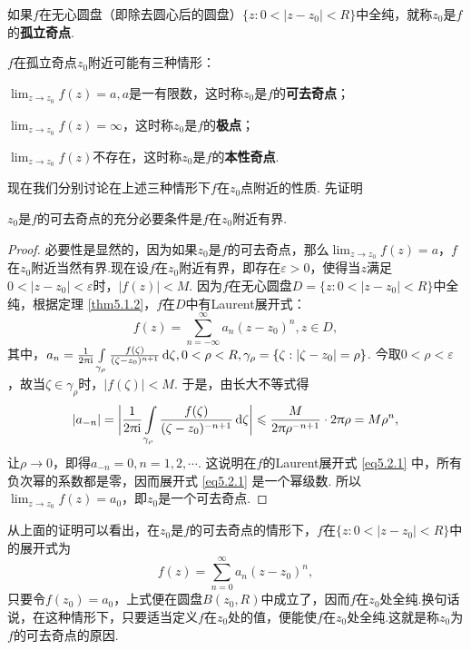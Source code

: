 如果$f$在无心圆盘（即除去圆心后的圆盘）$\{z:0<|z-z_0|<R\}$中全纯，就称$z_0$是$f$的\textbf{孤立奇点}.

$f$在孤立奇点$z_0$附近可能有三种情形：
\begin{eenum}
  \item $\lim_{z\to z_0}f(z)=a,a$是一有限数，这时称$z_0$是$f$的\textbf{可去奇点}；
  \item $\lim_{z\to z_0}f(z)=\infty$，这时称$z_0$是$f$的\textbf{极点}；
  \item $\lim_{z\to z_0}f(z)$不存在，这时称$z_0$是$f$的\textbf{本性奇点}.
\end{eenum}

现在我们分别讨论在上述三种情形下$f$在$z_0$点附近的性质. 先证明
\begin{theorem}\label{thm5.2.1}
  $z_0$是$f$的可去奇点的充分必要条件是$f$在$z_0$附近有界.
\end{theorem}
\begin{proof}
  必要性是显然的，因为如果$z_0$是$f$的可去奇点，那么$\lim_{z\to z_0}f(z)=a$，$f$在$z_0$附近当然有界.现在设$f$在$z_0$附近有界，即存在$\varepsilon>0$，使得当$z$满足$0<|z-z_0|<\varepsilon$时，$|f(z)|<M$. 因为$f$在无心圆盘$D=\{z:0<|z-z_0|<R\}$中全纯，根据定理 \ref{thm5.1.2}，$f$在$D$中有Laurent展开式：
  \begin{equation}\label{eq5.2.1}
    f(z) = \sum_{n=-\infty}^\infty a_n(z-z_0)^n,z\in D,
  \end{equation}
  其中，$a_n=\frac1{2\uppi\mathrm i}\int\limits_{\gamma_\rho}\frac{f(\zeta)}{(\zeta-z_0)^{n+1}}
  \mathop{}\!\mathrm{d} \zeta,0<\rho<R,\gamma_{\rho}=\{\zeta:|\zeta-z_0|=\rho\}$. 今取$0<\rho<\varepsilon$，故当$\zeta\in\gamma_\rho$时，$|f(\zeta)|<M$. 于是，由长大不等式得
  \[
    |a_{-n}| = \bigg|\frac1{2\uppi\mathrm i}\int\limits_{\gamma_\rho}
    \frac{f(\zeta)}{(\zeta-z_0)^{-n+1}}\mathop{}\!\mathrm{d} \zeta\bigg|\leqslant
    \frac M{2\uppi\rho^{-n+1}}\cdot2\uppi\rho=M\rho^n,
  \]
  让$\rho\to0$，即得$a_{-n}=0,n=1,2,\cdots$. 这说明在$f$的Laurent展开式 \eqref{eq5.2.1} 中，所有负次幂的系数都是零，因而展开式 \eqref{eq5.2.1} 是一个幂级数. 所以$\lim_{z\to z_0}f(z)=a_0$，即$z_0$是一个可去奇点.
\end{proof}

从上面的证明可以看出，在$z_0$是$f$的可去奇点的情形下，$f$在$\{z:0<|z-z_0|<R\}$中的展开式为
\[
  f(z) = \sum_{n=0}^\infty a_n(z-z_0)^n,
\]
只要令$f(z_0)=a_0$，上式便在圆盘$B(z_0,R)$中成立了，因而$f$在$z_0$处全纯.换句话说，在这种情形下，只要适当定义$f$在$z_0$处的值，便能使$f$在$z_0$处全纯.这就是称$z_0$为$f$的可去奇点的原因.

